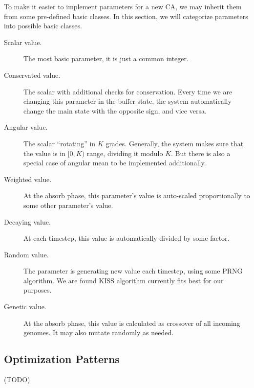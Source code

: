 \documentclass[a4paper,12pt,tikz,UTF8]{article}
\begin{document}
    To make it easier to implement parameters for a new CA, we may inherit them from some pre-defined basic classes. In this section, we will categorize parameters into possible basic classes.
    \begin{description}
      \item [Scalar value.] The most basic parameter, it is just a common integer.
      \item [Conservated value.] The scalar with additional checks for conservation. Every time we are changing this parameter in the buffer state, the system automatically change the main state with the opposite sign, and vice versa.
      \item [Angular value.] The scalar ``rotating'' in $K$ grades. Generally, the system makes sure that the value is in $[0, K)$ range, dividing it modulo $K$. But there is also a special case of angular mean to be implemented additionally. 
      \item [Weighted value.] At the absorb phase, this parameter's value is auto-scaled proportionally to some other parameter's value. 
      \item [Decaying value.] At each timestep, this value is automatically divided by some factor.
      \item [Random value.] The parameter is generating new value each timestep, using some PRNG algorithm. We are found KISS algorithm currently fits best for our purposes.
      \item [Genetic value.] At the absorb phase, this value is calculated as crossover of all incoming genomes. It may also mutate randomly as needed.
    \end{description}

  \subsection{Optimization Patterns}

    (TODO)
\end{document}
